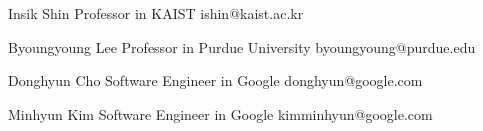 

\begin{cvhonors}

  \cvhonor
    {Insik Shin} %
    {Professor in KAIST} %
    {ishin@kaist.ac.kr} %
    {} %

  \cvhonor
    {Byoungyoung Lee} %
    {Professor in Purdue University} %
    {byoungyoung@purdue.edu} %
    {} %

  \cvhonor
    {Donghyun Cho} %
    {Software Engineer in Google} %
    {donghyun@google.com} %
    {} %

  \cvhonor
    {Minhyun Kim} %
    {Software Engineer in Google} %
    {kimminhyun@google.com} %
    {} %

\end{cvhonors}
